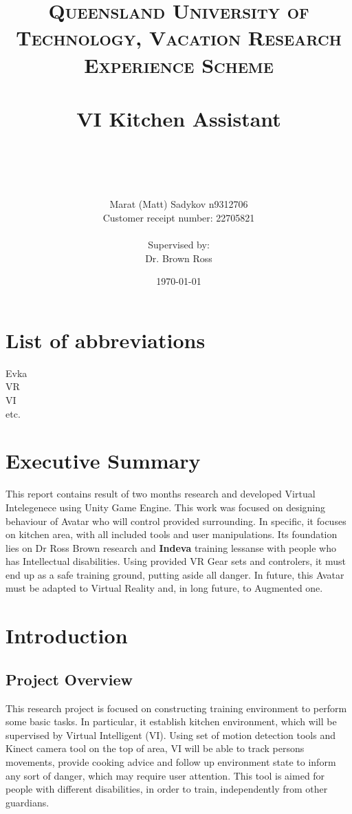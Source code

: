 \documentclass[18pt]{article}
\title{	
	\normalfont \normalsize 
	\textsc{Queensland University of Technology, Vacation Research Experience Scheme} \\ [25pt] 
	\horrule{0.5pt} \\[0.4cm] %
	\huge VI Kitchen Assistant \\ %
	\author{Marat (Matt) Sadykov \small n9312706 \\  Customer receipt number: \small 22705821 \\ \\ Supervised by: \\ Dr. Brown Ross \\ }
	\date{\normalsize\today} %
	\horrule{2pt} \\[0.5cm] %
}
\numberwithin{equation}{section} %
\numberwithin{figure}{section} %
\numberwithin{table}{section} %
\begin{document}
\maketitle
\newpage
\renewcommand*\contentsname{Table of Contents}
\tableofcontents
\listoffigures
\section{List of abbreviations}
	Evka \\
	VR \\
	VI \\
	etc.
\newpage	
\section{Executive Summary}
	This report contains result of two months research and developed Virtual Intelegenece using Unity Game Engine. This work was focused on designing behaviour of Avatar who will control provided surrounding. In specific, it focuses on kitchen area, with all included tools and user manipulations. Its foundation lies on Dr Ross Brown research and \textbf{Indeva} training lessanse with people who has Intellectual disabilities. Using provided VR Gear sets and controlers, it must end up as a safe training ground, putting aside all danger. In future, this Avatar must be adapted to Virtual Reality and, in long future, to Augmented one.
\section{Introduction}
	\subsection{Project Overview}
		This research project is focused on constructing training environment to perform some basic tasks. In particular, it establish kitchen environment, which will be supervised by Virtual Intelligent (VI). Using set of motion detection tools and Kinect camera tool on the top of area, VI will be able to track persons movements, provide cooking advice and follow up environment state to inform any sort of danger, which may require user attention. This tool is aimed for people with different disabilities, in order to train, independently from other guardians. \\
			
\end{document}
